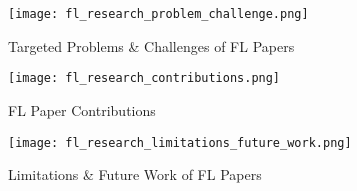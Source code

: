 \begin{figure}[p]
    \centering
    \texttt{[image: fl\_research\_problem\_challenge.png]}
    \caption{Targeted Problems \& Challenges of FL Papers}
    \label{fig:fl_research_problem_challenge}

    \texttt{[image: fl\_research\_contributions.png]}
    \caption{FL Paper Contributions}
    \label{fig:fl_research_contributions}
\end{figure}
\begin{figure}[h]
    \centering
    \texttt{[image: fl\_research\_limitations\_future\_work.png]}
    \caption{Limitations \& Future Work of FL Papers}
    \label{fig:fl_research_limitations_future_work}
\end{figure}




